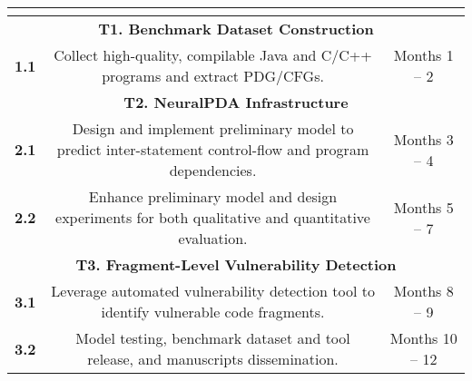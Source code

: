 \begin{table}[]
\begin{tabular}{|ccc|}
\hline
\multicolumn{3}{|c|}{\cellcolor[HTML]{343434}{\color[HTML]{FFFFFF} \textbf{Project Milestones \& Deliverables}}}                                                                     \\ \hline\hline
\multicolumn{3}{|c|}{\textbf{T1. Benchmark Dataset Construction}}                                                                                                                    \\ \hline
\multicolumn{1}{|p{1cm}|}{\textbf{1.1}} & \multicolumn{1}{c|}{Collect high-quality, compilable Java and C/C++ programs and extract PDG/CFGs.}                           & Months 1 -- 2   \\ \hline\hline
\multicolumn{3}{|c|}{\textbf{T2. NeuralPDA Infrastructure}}                                                                                                                          \\ \hline
\multicolumn{1}{|p{1cm}|}{\textbf{2.1}} & \multicolumn{1}{c|}{Design and implement preliminary model to predict inter-statement control-flow and program dependencies.} & Months 3 -- 4   \\
\multicolumn{1}{|p{1cm}|}{\textbf{2.2}} & \multicolumn{1}{c|}{Enhance preliminary model and design experiments for both qualitative and quantitative evaluation.}       & Months 5 -- 7   \\ \hline\hline
\multicolumn{3}{|c|}{\textbf{T3. Fragment-Level Vulnerability Detection}}                                                                                                            \\ \hline
\multicolumn{1}{|p{1cm}|}{\textbf{3.1}} & \multicolumn{1}{c|}{Leverage automated vulnerability detection tool to identify vulnerable code fragments.}                   & Months 8 -- 9   \\
\multicolumn{1}{|p{1cm}|}{\textbf{3.2}} & \multicolumn{1}{c|}{Model testing, benchmark dataset and tool release, and manuscripts dissemination.}                        & Months 10 -- 12 \\ \hline
\end{tabular}
\end{table}